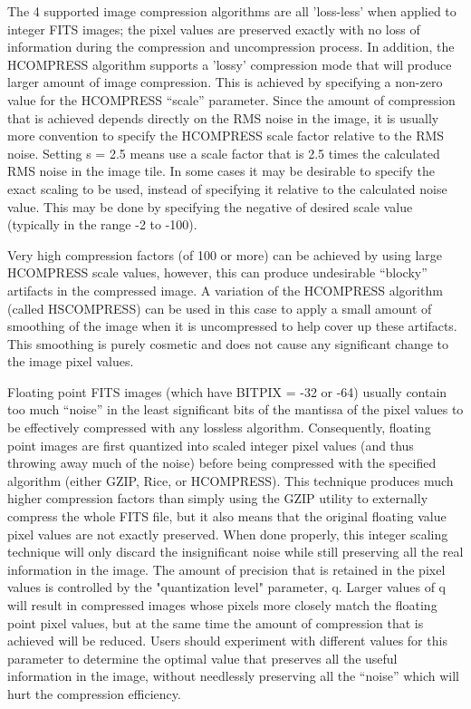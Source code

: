 \documentclass[11pt]{book}
\begin{document}
The 4 supported image compression algorithms are all 'loss-less' when
applied to integer FITS images;  the pixel values are preserved exactly with
no loss of information during the compression and uncompression process.  In
addition, the HCOMPRESS algorithm supports a 'lossy' compression mode that
will produce
larger amount of image compression.  This is achieved by specifying a non-zero
value for the HCOMPRESS ``scale''
parameter.  Since the amount of compression that is achieved depends directly
on the RMS noise in the image, it is usually more convention
to specify the HCOMPRESS scale factor relative to the RMS noise.
Setting s = 2.5 means use a scale factor that is 2.5 times the calculated RMS noise
in the image tile.   In some cases
it may be desirable to specify the exact scaling to be used,
instead of specifying it relative to the calculated noise value.  This may
be done by specifying the negative of desired scale value (typically
in the range -2 to -100).

Very high compression factors (of 100 or more) can be
achieved by using large HCOMPRESS scale values, however, this can produce undesirable
``blocky'' artifacts in the compressed image.  A variation of the HCOMPRESS
algorithm (called HSCOMPRESS) can be used in this case to apply a small
amount of smoothing of the image when it is uncompressed to help cover up
these artifacts.  This smoothing is purely cosmetic and does not cause any
significant change to the image pixel values.

Floating point FITS images (which have BITPIX = -32 or -64) usually contain
too much ``noise'' in the least significant bits of the mantissa of the
pixel values  to be effectively compressed with any lossless algorithm.
Consequently, floating point images are first quantized into scaled integer
pixel values (and thus throwing away much of the noise) before being
compressed with the specified algorithm (either GZIP, Rice, or HCOMPRESS).
This technique produces much higher compression factors than
simply using the GZIP utility to externally compress the whole FITS file,  but it also
means that the original floating value pixel values are not exactly
preserved. When done properly, this  integer scaling technique will only
discard the insignificant noise while still preserving all the real
information in the image.  The amount of precision that is retained in the
pixel values is controlled by the "quantization level" parameter, q.  Larger
values of q will result in compressed images whose pixels more closely match
the floating point pixel values, but at the same time the amount of
compression that is achieved will be reduced.  Users should experiment with
different values for  this parameter to determine the optimal value that
preserves all the useful information in the image, without needlessly
preserving all the ``noise'' which will hurt the compression efficiency.
\end{document}
